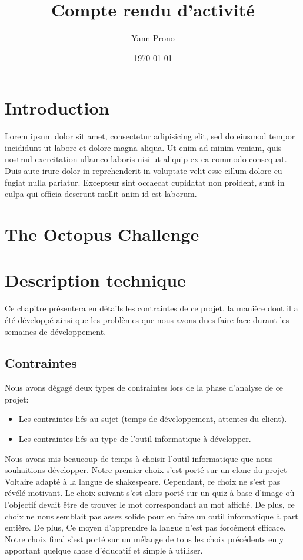 \documentclass[a4paper,11pt, oneside]{book}
\title{Compte rendu d'activité}
\author{Yann Prono}
\date{\today}
\def\appName{The Octopus Challenge}
\begin{document}
	\begin{titlepage}
		
	\end{titlepage}


	\newpage

	\newpage\null\thispagestyle{empty}\newpage
	\tableofcontents

	\chapter{Introduction}
	Lorem ipsum dolor sit amet, consectetur adipisicing elit, sed do eiusmod tempor incididunt ut labore et dolore magna aliqua. Ut enim ad minim veniam, quis nostrud exercitation ullamco laboris nisi ut aliquip ex ea commodo consequat. Duis aute irure dolor in reprehenderit in voluptate velit esse cillum dolore eu fugiat nulla pariatur. Excepteur sint occaecat cupidatat non proident, sunt in culpa qui officia deserunt mollit anim id est laborum.
	\setcounter{page}{1}
	\clearpage

	\chapter{\appName}
	\clearpage

	\chapter{Description technique}

	Ce chapitre présentera en détails les contraintes de ce projet, la manière dont il a été développé ainsi que les problèmes que nous avons dues faire face
	durant les semaines de développement.

	\section{Contraintes}

	Nous avons dégagé deux types de contraintes lors de la phase d'analyse de ce projet:
	\begin{itemize}
		\item Les contraintes liés au sujet (temps de développement, attentes du client).
		\item Les contraintes liés au type de l'outil informatique à développer.\\
	\end{itemize}

Nous avons mis beaucoup de temps à choisir l'outil informatique que nous souhaitions développer. Notre premier choix s'est porté sur un clone du projet Voltaire adapté à la langue de shakespeare.
Cependant, ce choix ne s'est pas révélé motivant. Le choix suivant s'est alors porté sur un quiz à base d'image où l'objectif devait être de trouver le mot correspondant au mot affiché. De plus, ce choix
ne nous semblait pas assez solide pour en faire un outil informatique à part entière. De plus, Ce moyen d'apprendre la langue n'est pas forcément efficace.
Notre choix final s'est porté sur un mélange de tous les choix précédents en y apportant quelque chose d'éducatif et simple à utiliser.\\
\end{document}
